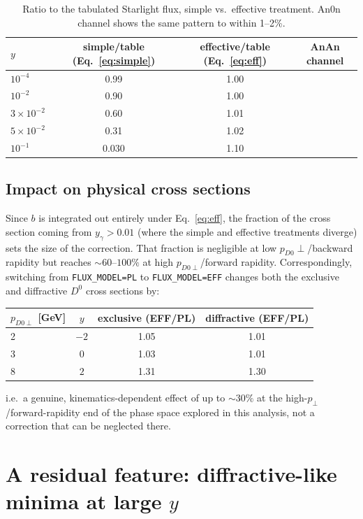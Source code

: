 \documentclass[11pt]{article}
\begin{document}
\begin{table}[h]
\centering
\begin{tabular}{lccc}
\hline
$y$ & simple/table (Eq.~\ref{eq:simple}) & effective/table (Eq.~\ref{eq:eff}) & AnAn channel \\
\hline
$10^{-4}$ & 0.99 & 1.00 & \\
$10^{-2}$ & 0.90 & 1.00 & \\
$3\times10^{-2}$ & 0.60 & 1.01 & \\
$5\times10^{-2}$ & 0.31 & 1.02 & \\
$10^{-1}$ & 0.030 & 1.10 & \\
\hline
\end{tabular}
\caption{Ratio to the tabulated Starlight flux, simple vs.\ effective
treatment. An0n channel shows the same pattern to within 1--2\%.}
\label{tab:eff}
\end{table}

\subsection{Impact on physical cross sections}

Since $b$ is integrated out entirely under Eq.~\eqref{eq:eff}, the fraction
of the cross section coming from $y_\gamma>0.01$ (where the simple and
effective treatments diverge) sets the size of the correction. That
fraction is negligible at low $p_{D0}\perp$/backward rapidity but reaches
$\sim60$--$100\%$ at high $p_{D0\perp}$/forward rapidity. Correspondingly,
switching from \texttt{FLUX\_MODEL=PL} to \texttt{FLUX\_MODEL=EFF} changes
both the exclusive and diffractive $D^0$ cross sections by:
\begin{center}
\begin{tabular}{lccc}
\hline
$p_{D0\perp}$ [GeV] & $y$ & exclusive (EFF/PL) & diffractive (EFF/PL) \\
\hline
2 & $-2$ & 1.05 & 1.01 \\
3 & $0$  & 1.03 & 1.01 \\
8 & $2$  & 1.31 & 1.30 \\
\hline
\end{tabular}
\end{center}
i.e.\ a genuine, kinematics-dependent effect of up to $\sim30\%$ at the
high-$p_\perp$/forward-rapidity end of the phase space explored in this
analysis, not a correction that can be neglected there.

\section{A residual feature: diffractive-like minima at large $y$}
\end{document}
